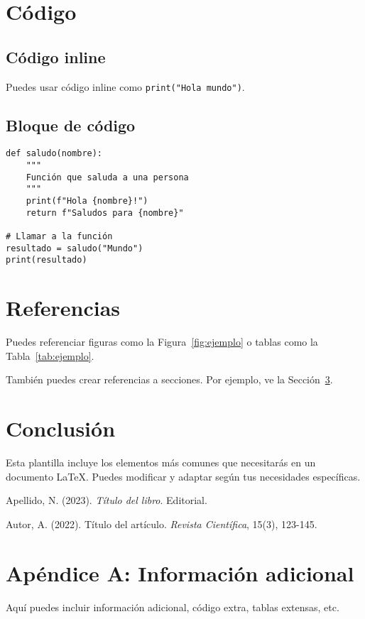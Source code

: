 \documentclass[12pt,a4paper]{article}
\begin{document}
\section{Código}

\subsection{Código inline}
Puedes usar código inline como \verb|print("Hola mundo")|.

\subsection{Bloque de código}
\begin{lstlisting}[caption=Ejemplo de código Python]
def saludo(nombre):
    """
    Función que saluda a una persona
    """
    print(f"Hola {nombre}!")
    return f"Saludos para {nombre}"

# Llamar a la función
resultado = saludo("Mundo")
print(resultado)
\end{lstlisting}

\section{Referencias}

Puedes referenciar figuras como la Figura~\ref{fig:ejemplo} o tablas como la Tabla~\ref{tab:ejemplo}.

También puedes crear referencias a secciones. Por ejemplo, ve la Sección~\ref{sec:conclusion}.

\section{Conclusión}
\label{sec:conclusion}

Esta plantilla incluye los elementos más comunes que necesitarás en un documento LaTeX. Puedes modificar y adaptar según tus necesidades específicas.

\begin{thebibliography}{9}
Apellido, N. (2023). \textit{Título del libro}. Editorial.

Autor, A. (2022). Título del artículo. \textit{Revista Científica}, 15(3), 123-145.
\end{thebibliography}

\appendix
\section{Apéndice A: Información adicional}

Aquí puedes incluir información adicional, código extra, tablas extensas, etc.
\end{document}
